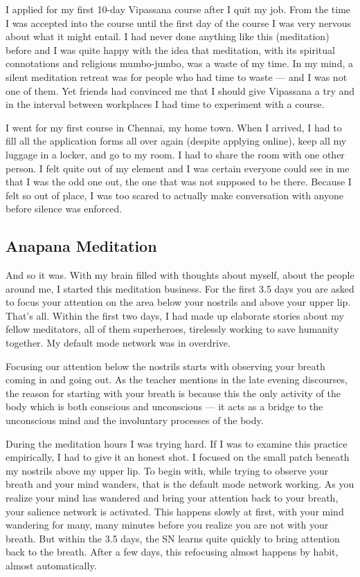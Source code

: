 \documentclass[twocolumn]{article}
\begin{document}
I applied for my first 10-day Vipassana course after I quit my job. From the time I
was accepted into the course until the first day of the course I was very nervous
about what it might entail. I had never done anything like this (meditation) before
and I was quite happy with the idea that meditation, with its spiritual connotations
and religious mumbo-jumbo, was a waste of my time. In my mind, a silent meditation retreat was
for people who had time to waste --- and I was not one of them. Yet friends had convinced me that I
should give Vipassana a try and in the interval between workplaces I had
time to experiment with a course.

I went for my first course in Chennai, my home town. When I arrived, I had to fill
all the application forms all over again (despite applying online), keep all my
luggage in a locker, and go to my room. I had to share the room with one other
person. I felt quite out of my element and I was certain everyone could see in me
that I was the odd one out, the one that was not supposed to be there. Because I felt
so out of place, I was too scared to actually make conversation with anyone before
silence was enforced.

\subsection{Anapana Meditation}

And so it was. With my brain filled with thoughts about myself, about the people
around me, I started this meditation business. For the first 3.5 days you are asked
to focus your attention on the area below your nostrils and above your upper
lip. That's all. Within the first two days, I had made up elaborate stories about my
fellow meditators, all of them superheroes, tirelessly working to save humanity
together. My default mode network was in overdrive.

Focusing our attention below the nostrils starts with observing your breath coming in
and going out. As the teacher mentions in the late evening discourses, the reason for
starting with your breath is because this the only activity of the body which is both
conscious and unconscious --- it acts as a bridge to the unconscious mind and the
involuntary processes of the body.

During the meditation hours I was trying hard. If I was to examine this practice
empirically, I had to give it an honest shot. I focused on the small patch beneath my
nostrils above my upper lip. To begin with, while trying to observe your breath and
your mind wanders, that is the default mode network working. As you realize your mind
has wandered and bring your attention back to your breath, your salience network is
activated. This happens slowly at first, with your mind wandering for many, many
minutes before you realize you are not with your breath. But within the 3.5 days, the
SN learns quite quickly to bring attention back to the breath. After a few days, this
refocusing almost happens by habit, almost automatically.
\end{document}

